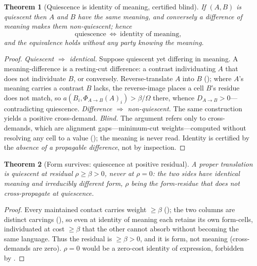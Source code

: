 \documentclass[twocolumn,11pt,a4paper]{article}
\theoremstyle{sup}
\newtheorem{theorem}{Theorem}[section]
\theoremstyle{definition}
\theoremstyle{remark}
\newcommand{\flo}{\beta}
\newcommand{\res}{\rho}
\newcommand{\al}{a}
\newcommand{\Om}{\Omega}
\newcommand{\dem}{D}
\newcommand{\colA}{A}
\newcommand{\colB}{B}
\newcommand{\rlx}{\Phi}
\begin{document}
\begin{theorem}[Quiescence is identity of meaning, certified blind]
\label{thm:quiescence}
If $(\colA,\colB)$ is quiescent then $\colA$ and $\colB$ have the same meaning,
and conversely a difference of meaning makes them non-quiescent; hence
\[
\text{quiescence}\ \Longleftrightarrow\ \text{identity of meaning},
\]
and the equivalence holds without any party knowing the meaning.
\end{theorem}

\begin{proof}
\emph{Quiescent $\Rightarrow$ identical.} Suppose quiescent yet differing in
meaning. A meaning-difference is a resting-cut difference: a contrast
individuating $\colA$ that does not individuate $\colB$, or conversely.
Reverse-translate $\colA$ into $\colB$ (); where $\colA$'s
meaning carries a contrast $\colB$ lacks, the reverse-image places a cell
$\colB$'s residue does not match, so
$\al(\colB_i,\rlx_{\colA\to\colB}(\colA)_i)>\flo/\Om$ there, whence
$\dem_{\colA\to\colB}>0$---contradicting quiescence. \emph{Difference
$\Rightarrow$ non-quiescent.} The same construction yields a positive
cross-demand. \emph{Blind.} The argument refers only to cross-demands, which are
alignment gaps---minimum-cut weights---computed without resolving any cell to a
value (); the meaning is never read. Identity is
certified by the \emph{absence of a propagable difference}, not by inspection.
\end{proof}

\begin{theorem}[Form survives: quiescence at positive residual]
\label{thm:form}
A proper translation is quiescent at residual $\res\ge\flo>0$, never at
$\res=0$: the two sides have identical meaning and irreducibly different form,
$\res$ being the form-residue that does not cross-propagate at quiescence.
\end{theorem}

\begin{proof}
Every maintained contact carries weight $\ge\flo$ (); the two
columns are distinct carvings (), so even at identity of
meaning each retains its own form-cells, individuated at cost $\ge\flo$ that the
other cannot absorb without becoming the same language. Thus the residual is
$\ge\flo>0$, and it is form, not meaning (cross-demands are zero). $\res=0$ would
be a zero-cost identity of expression, forbidden by .
\end{proof}
\end{document}

